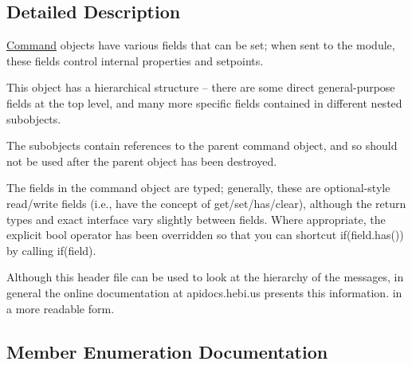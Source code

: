 \subsection{Detailed Description}
\hyperlink{classhebi_1_1Command}{Command} objects have various fields that can be set; when sent to the module, these fields control internal properties and setpoints. 

This object has a hierarchical structure -- there are some direct general-\/purpose fields at the top level, and many more specific fields contained in different nested subobjects.

The subobjects contain references to the parent command object, and so should not be used after the parent object has been destroyed.

The fields in the command object are typed; generally, these are optional-\/style read/write fields (i.\+e., have the concept of get/set/has/clear), although the return types and exact interface vary slightly between fields. Where appropriate, the explicit bool operator has been overridden so that you can shortcut {\ttfamily if}(field.\+has()) by calling {\ttfamily if(field)}.

Although this header file can be used to look at the hierarchy of the messages, in general the online documentation at apidocs.\+hebi.\+us presents this information. in a more readable form. 

\subsection{Member Enumeration Documentation}
